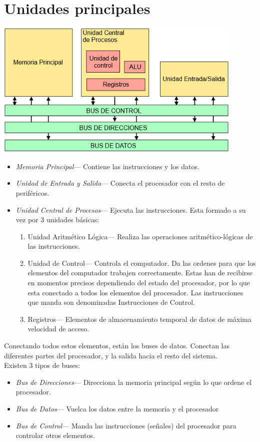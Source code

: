 \documentclass[a4paper,11pt,spanish]{report}
\begin{document}
\section{Unidades principales}
\begin{center}
\includegraphics{res/tema1/unidadesppales.png}
\end{center}
\begin{itemize}
\item \emph{Memoria Principal}--- Contiene las instrucciones y los datos.
\item \emph{Unidad de Entrada y Salida}--- Conecta el procesador con el resto de periféricos.
\item \emph{Unidad Central de Procesos}--- Ejecuta las instrucciones. Esta formado a su vez por 3 unidades básicas:
\begin{enumerate}
\item Unidad Aritmético Lógica--- Realiza las operaciones aritmético-lógicas de las instrucciones.
\item Unidad de Control--- Controla el computador. Da las ordenes para que los elementos del computador trabajen correctamente. Estas han de recibirse en momentos precisos dependiendo del estado del procesador, por lo que esta conectado a todos los elementos del procesador. Las instrucciones que manda son denominadas Instrucciones de Control.
\item Registros--- Elementos de almacenamiento temporal de datos de máxima velocidad de acceso.
\end{enumerate}
\end{itemize}
Conectando todos estos elementos, están los buses de datos. Conectan las diferentes partes del procesador, y la salida hacia el resto del sistema.
\\
Existen 3 tipos de buses:
\begin{itemize}
\item \emph{Bus de Direcciones}--- Direcciona la memoria principal según lo que ordene el procesador.
\item \emph{Bus de Datos}--- Vuelca los datos entre la memoria y el procesador
\item \emph{Bus de Control}--- Manda las instrucciones (señales) del procesador para controlar otros elementos.
\end{itemize}
\end{document}

